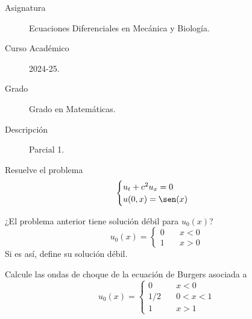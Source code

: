 \documentclass[12pt]{article}
\begin{document}

    
    

    \begin{description}
        \item[Asignatura] Ecuaciones Diferenciales en Mecánica y Biología.
        \item[Curso Académico] 2024-25.
        \item[Grado] Grado en Matemáticas.
        \item[Descripción] Parcial 1. 
    \end{description}
    \newpage



    \begin{ejercicio}
        Resuelve el problema
        \begin{equation*}
            \begin{cases}
                u_t + c^2u_x = 0 \\
                u(0,x) = \sen(x)
            \end{cases}
        \end{equation*}
    \end{ejercicio}

    \begin{ejercicio}
        ¿El problema anterior tiene solución débil para $u_0(x)$?
        $$u_0(x) = \begin{cases}
            0 \quad& x<0 \\
            1 \quad& x>0
        \end{cases}$$
        Si es así, define su solución débil.
    \end{ejercicio}

    \begin{ejercicio}
        Calcule las ondas de choque de la ecuación de Burgers asociada a
        $$u_0(x) = \begin{cases}
            0 \quad& x<0 \\
            1/2 \quad& 0<x<1 \\
            1 \quad& x>1
        \end{cases}$$
    \end{ejercicio}
\end{document}
